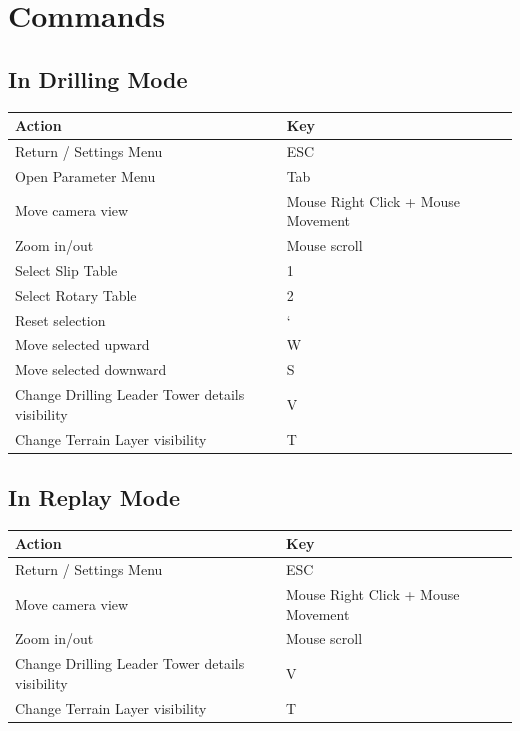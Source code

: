 \documentclass{article}
\begin{document}
\newpage
\section{Commands}
\subsection{In Drilling Mode}
\begin{table}[h]
    \begin{tabular}{|l|l|}
        \hline
        \textbf{Action} & \textbf{Key}\\
        \hline
        Return / Settings Menu & ESC\\
        \hline
        Open Parameter Menu & Tab\\
        \hline
        Move camera view & Mouse Right Click + Mouse Movement\\
        \hline
        Zoom in/out & Mouse scroll\\
        \hline
        Select Slip Table & 1\\
        \hline
        Select Rotary Table	& 2\\
        \hline
        Reset selection & `\\
        \hline
        Move selected upward & W\\
        \hline
        Move selected downward & S\\
        \hline
        Change Drilling Leader Tower details visibility	& V\\
        \hline
        Change Terrain Layer visibility & T\\
        \hline
    \end{tabular}
\end{table}

\subsection{In Replay Mode}
\begin{table}[h]
    \begin{tabular}{|l|l|}
        \hline
        \textbf{Action} & \textbf{Key}\\
        \hline
        Return / Settings Menu & ESC\\
        \hline
        Move camera view & Mouse Right Click + Mouse Movement\\
        \hline
        Zoom in/out & Mouse scroll\\
        \hline
        Change Drilling Leader Tower details visibility	& V\\
        \hline
        Change Terrain Layer visibility & T\\
        \hline
    \end{tabular}
\end{table}
\end{document}
